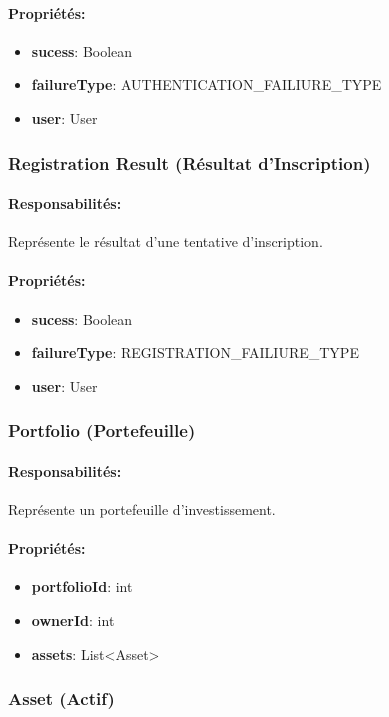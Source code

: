 \documentclass{article}
\begin{document}
\paragraph{Propriétés:}
\begin{itemize}
  \item \textbf{sucess}: Boolean
  \item \textbf{failureType}: AUTHENTICATION\_FAILIURE\_TYPE
  \item \textbf{user}: User
\end{itemize}
\subsubsection{Registration Result (Résultat d'Inscription)}
\paragraph{Responsabilités:} Représente le résultat d'une tentative d'inscription.
\paragraph{Propriétés:}
\begin{itemize}
  \item \textbf{sucess}: Boolean
  \item \textbf{failureType}: REGISTRATION\_FAILIURE\_TYPE
  \item \textbf{user}: User
\end{itemize}
\subsubsection{Portfolio (Portefeuille)}
\paragraph{Responsabilités:} Représente un portefeuille d'investissement.
\paragraph{Propriétés:}
\begin{itemize}
  \item \textbf{portfolioId}: int
  \item \textbf{ownerId}: int
  \item \textbf{assets}: List<Asset>
\end{itemize}
\subsubsection{Asset (Actif)}
\end{document}
